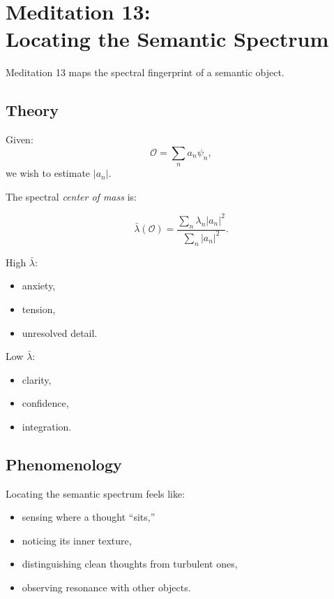 \documentclass[12pt]{article}
\begin{document}
\newpage


\chapter{Meditation 13:\\ Locating the Semantic Spectrum}

Meditation 13 maps the spectral fingerprint of a semantic object.

\section{Theory}

Given:
\[
\mathcal{O}
= \sum_{n} a_n \psi_n,
\]
we wish to estimate $|a_n|$.

The spectral \emph{center of mass} is:

\[
\bar{\lambda}(\mathcal{O})
    = \frac{\sum_n \lambda_n |a_n|^2}{\sum_n |a_n|^2}.
\]

High $\bar{\lambda}$:

\begin{itemize}
\item anxiety,
\item tension,
\item unresolved detail.
\end{itemize}

Low $\bar{\lambda}$:

\begin{itemize}
\item clarity,
\item confidence,
\item integration.
\end{itemize}

\section{Phenomenology}

Locating the semantic spectrum feels like:

\begin{itemize}
    \item sensing where a thought ``sits,''  
    \item noticing its inner texture,  
    \item distinguishing clean thoughts from turbulent ones,  
    \item observing resonance with other objects.  
\end{itemize}
\end{document}
